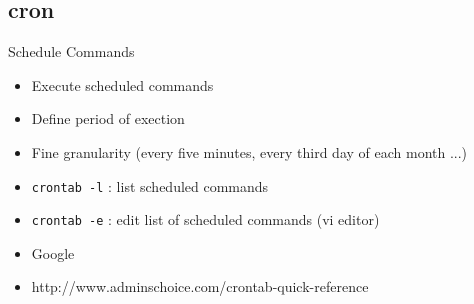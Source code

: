 \subsection{cron}

\begin{frame}[fragile]{Schedule Commands}
  \begin{itemize}
    \pause \item Execute scheduled commands
    \pause \item Define period of exection
    \pause \item Fine granularity (every five minutes, every third day of each month ...)
    \pause \item \texttt{crontab -l} : list scheduled commands
    \pause \item \texttt{crontab -e} : edit list of scheduled commands (vi editor)
    \pause \item Google
    \item http://www.adminschoice.com/crontab-quick-reference
  \end{itemize}
\end{frame}



